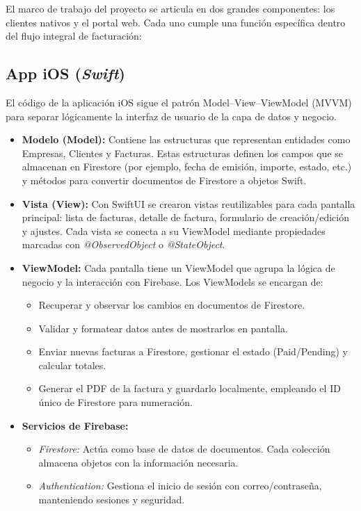 \begin{large}

El marco de trabajo del proyecto se articula en dos grandes componentes: los clientes nativos y el portal web. Cada uno cumple una función específica dentro del flujo integral de facturación:

\end{large}

\subsection{App iOS (\textit{Swift})}

\begin{large}

El código de la aplicación iOS sigue el patrón Model–View–ViewModel (MVVM) para separar lógicamente la interfaz de usuario de la capa de datos y negocio. 
\begin{itemize}
  \item \textbf{Modelo (Model):} Contiene las estructuras que representan entidades como Empresas, Clientes y Facturas. Estas estructuras definen los campos que se almacenan en Firestore (por ejemplo, fecha de emisión, importe, estado, etc.) y métodos para convertir documentos de Firestore a objetos Swift.
  \item \textbf{Vista (View):} Con SwiftUI se crearon vistas reutilizables para cada pantalla principal: lista de facturas, detalle de factura, formulario de creación/edición y ajustes. Cada vista se conecta a su ViewModel mediante propiedades marcadas con \textit{@ObservedObject} o \textit{@StateObject}.
  \item \textbf{ViewModel:} Cada pantalla tiene un ViewModel que agrupa la lógica de negocio y la interacción con Firebase. Los ViewModels se encargan de:
    \begin{itemize}
      \item Recuperar y observar los cambios en documentos de Firestore.
      \item Validar y formatear datos antes de mostrarlos en pantalla.
      \item Enviar nuevas facturas a Firestore, gestionar el estado (Paid/Pending) y calcular totales.
      \item Generar el PDF de la factura y guardarlo localmente, empleando el ID único de Firestore para numeración.
    \end{itemize}
  \item \textbf{Servicios de Firebase:}  
    \begin{itemize}
      \item \textit{Firestore:} Actúa como base de datos de documentos. Cada colección almacena objetos con la información necesaria.
      \item \textit{Authentication:} Gestiona el inicio de sesión con correo/contraseña, manteniendo sesiones y seguridad.
    \end{itemize}
\end{itemize}

\end{large}

